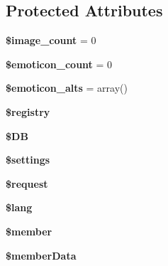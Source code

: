 \subsection*{Protected Attributes}
\begin{DoxyCompactItemize}
\item 
\hypertarget{classclass__bbcode__core_a010b8467561191e260690825f5197fea}{{\bfseries \$image\-\_\-count} = 0}\label{classclass__bbcode__core_a010b8467561191e260690825f5197fea}

\item 
\hypertarget{classclass__bbcode__core_a6098025092f59f3af21dec9b6b4425e3}{{\bfseries \$emoticon\-\_\-count} = 0}\label{classclass__bbcode__core_a6098025092f59f3af21dec9b6b4425e3}

\item 
\hypertarget{classclass__bbcode__core_a8b0f6642c53902d1d178a81551b4f56f}{{\bfseries \$emoticon\-\_\-alts} = array()}\label{classclass__bbcode__core_a8b0f6642c53902d1d178a81551b4f56f}

\item 
\hypertarget{classclass__bbcode__core_a531e4a386aaa7f3e06d3642dc38d7e80}{{\bfseries \$registry}}\label{classclass__bbcode__core_a531e4a386aaa7f3e06d3642dc38d7e80}

\item 
\hypertarget{classclass__bbcode__core_a7dc56dc8b18ad37272b56fa7395bedef}{{\bfseries \$\-D\-B}}\label{classclass__bbcode__core_a7dc56dc8b18ad37272b56fa7395bedef}

\item 
\hypertarget{classclass__bbcode__core_ac7c3353107070daa85f641882931b358}{{\bfseries \$settings}}\label{classclass__bbcode__core_ac7c3353107070daa85f641882931b358}

\item 
\hypertarget{classclass__bbcode__core_abb35c8495a232b510389fa6d7b15d38a}{{\bfseries \$request}}\label{classclass__bbcode__core_abb35c8495a232b510389fa6d7b15d38a}

\item 
\hypertarget{classclass__bbcode__core_a7714b111b644017933931ec69a154102}{{\bfseries \$lang}}\label{classclass__bbcode__core_a7714b111b644017933931ec69a154102}

\item 
\hypertarget{classclass__bbcode__core_a5e1c849c6148a8732eee400fcee0d044}{{\bfseries \$member}}\label{classclass__bbcode__core_a5e1c849c6148a8732eee400fcee0d044}

\item 
\hypertarget{classclass__bbcode__core_ae9d848ba2cf6eee63bdc060e2dfcf95a}{{\bfseries \$member\-Data}}\label{classclass__bbcode__core_ae9d848ba2cf6eee63bdc060e2dfcf95a}


\end{DoxyCompactItemize}
